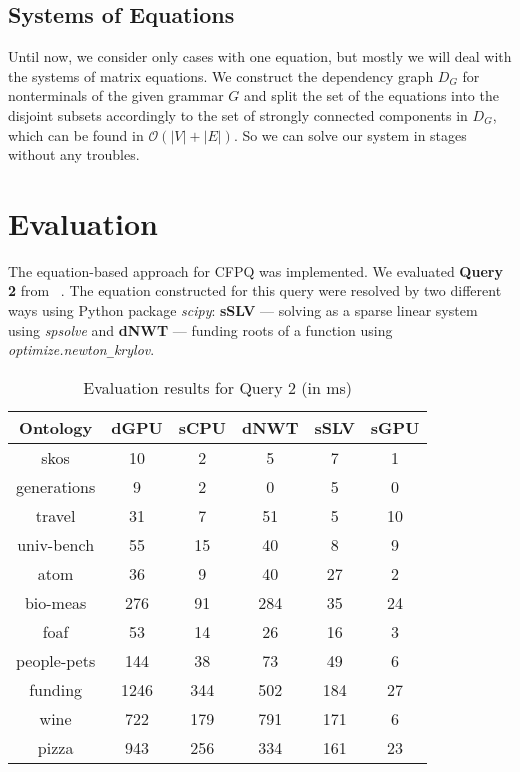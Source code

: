 \documentclass[sigconf]{acmart}
\begin{document}
\subsection{Systems of Equations}

Until now, we consider only cases with one equation, but mostly we will deal with the systems of matrix equations.
We construct the dependency graph $D_G$ for nonterminals of the given grammar $G$ and split the set of the equations into the disjoint subsets accordingly to the set of strongly connected components in $D_G$, which can be found in $\mathcal{O}(|V| + |E|)$.
So we can solve our system in stages without any troubles.


\section{Evaluation}

The equation-based approach for CFPQ was implemented.
We evaluated \textbf{Query 2} from ~\cite{azimov2018context}.
The equation constructed for this query were resolved by two different ways using Python package \textit{scipy}: 
\textbf{sSLV} --- solving as a sparse linear system using \textit{spsolve}
and
\textbf{dNWT} --- funding roots of a function using \textit{optimize.newton\texttt{\_}krylov}.

\begin{table}[h]
\centering
\caption{Evaluation results for Query 2 (in ms)}
\label{tbl2}

\begin{tabular}{ | c | c | c | c | c | c |}
\hline
Ontology & dGPU & sCPU & dNWT & sSLV & sGPU \\
\hline 
\hline
skos   & 10 & 2 & 5 & 7 & 1\\
generations  & 9 & 2 & 0 & 5 & 0\\
travel   & 31 & 7 & 51 & 5 & 10\\
univ-bench   & 55 & 15 & 40 & 8 & 9\\
atom   & 36 & 9 & 40 & 27 & 2\\
bio-meas  & 276 & 91 & 284 & 35 & 24\\
foaf & 53 & 14 & 26 & 16 & 3\\
people-pets   & 144 & 38 & 73 & 49 & 6\\
funding  & 1246 & 344 & 502 & 184 & 27\\
wine  & 722 & 179 & 791 & 171 & 6\\
pizza  & 943 & 256 & 334 & 161 & 23\\
\hline
\end{tabular}

\end{table}
\end{document}
